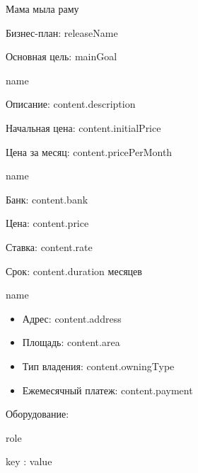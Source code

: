\documentclass[a4paper,12pt]{article}
\begin{document}
  Мама мыла раму

  Бизнес-план: {{ releaseName }}
  
  Основная цель: {{ mainGoal }}

{%
  {%
    {%
      {{ name }}

      Описание: {{ content.description }}
      
      Начальная цена: {{ content.initialPrice }}
      
      Цена за месяц: {{ content.pricePerMonth }}
    {%
  {%
{%

{%
  {%
    {%
      {{ name }}

      Банк: {{ content.bank }}
      
      Цена: {{ content.price }}
      
      Ставка: {{ content.rate }}

      Срок: {{ content.duration }} месяцев
    {%
  {%
{%

{%
  {%
    {{ name }}

    \begin{itemize}
    \item Адрес: {{ content.address }}
    \item Площадь: {{ content.area }}
    \item Тип владения: {{ content.owningType }}
    \item Ежемесячный платеж: {{ content.payment }}
    \end{itemize}
    {%
    Оборудование:
    {%
    {%
      {%
      {{ role }}
        {%
        {{ key }}: {{ value }}

}}}}}}}}}}}}}}}}}}}
\end{document}
